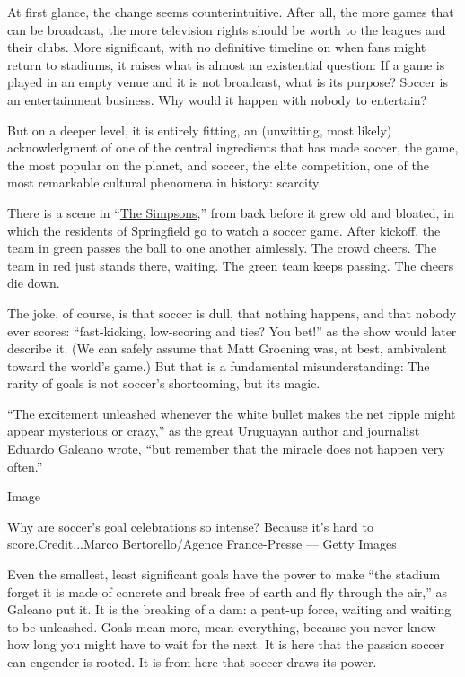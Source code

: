 At first glance, the change seems counterintuitive. After all, the more
games that can be broadcast, the more television rights should be worth
to the leagues and their clubs. More significant, with no definitive
timeline on when fans might return to stadiums, it raises what is almost
an existential question: If a game is played in an empty venue and it is
not broadcast, what is its purpose? Soccer is an entertainment business.
Why would it happen with nobody to entertain?

But on a deeper level, it is entirely fitting, an (unwitting, most
likely) acknowledgment of one of the central ingredients that has made
soccer, the game, the most popular on the planet, and soccer, the elite
competition, one of the most remarkable cultural phenomena in history:
scarcity.

There is a scene in
``\href{https://www.youtube.com/watch?v=ftlfPb0gyxI}{The Simpsons},''
from back before it grew old and bloated, in which the residents of
Springfield go to watch a soccer game. After kickoff, the team in green
passes the ball to one another aimlessly. The crowd cheers. The team in
red just stands there, waiting. The green team keeps passing. The cheers
die down.

The joke, of course, is that soccer is dull, that nothing happens, and
that nobody ever scores: ``fast-kicking, low-scoring and ties? You
bet!'' as the show would later describe it. (We can safely assume that
Matt Groening was, at best, ambivalent toward the world's game.) But
that is a fundamental misunderstanding: The rarity of goals is not
soccer's shortcoming, but its magic.

``The excitement unleashed whenever the white bullet makes the net
ripple might appear mysterious or crazy,'' as the great Uruguayan author
and journalist Eduardo Galeano wrote, ``but remember that the miracle
does not happen very often.''

Image

Why are soccer's goal celebrations so intense? Because it's hard to
score.Credit...Marco Bertorello/Agence France-Presse --- Getty Images

Even the smallest, least significant goals have the power to make ``the
stadium forget it is made of concrete and break free of earth and fly
through the air,'' as Galeano put it. It is the breaking of a dam: a
pent-up force, waiting and waiting to be unleashed. Goals mean more,
mean everything, because you never know how long you might have to wait
for the next. It is here that the passion soccer can engender is rooted.
It is from here that soccer draws its power.

